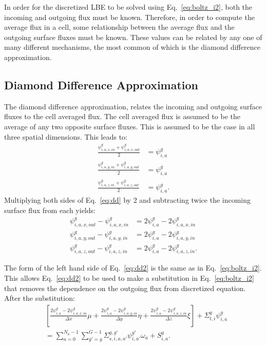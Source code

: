 In order for the discretized LBE to be solved using Eq.~\ref{eq:boltz_i2}, both the incoming and outgoing flux must be known. Therefore, in order to compute the average flux in a cell, some relationship between the average flux and the outgoing surface fluxes must be known. These values can be related by any one of many different mechanisms, the most common of which is the diamond difference approximation.

\subsection{Diamond Difference Approximation}

The diamond difference approximation, relates the incoming and outgoing surface fluxes to the cell averaged flux. The cell averaged flux is assumed to be the average of any two opposite surface fluxes. This is assumed to be the case in all three spatial dimensions. This leads to:
\begin{equation} \label{eq:dd}
\begin{split}
\frac{\psi_{i,a,x,in}^g + \psi_{i,a,x,out}^g}{2} &= \psi_{i,a}^{g} \\
\frac{\psi_{i,a,y,in}^g + \psi_{i,a,y,out}^g}{2} &= \psi_{i,a}^{g} \\
\frac{\psi_{i,a,z,in}^g + \psi_{i,a,z,out}^g}{2} &= \psi_{i,a}^{g}.
\end{split}
\end{equation}
Multiplying both sides of Eq.~\ref{eq:dd} by 2 and subtracting twice the incoming surface flux from each yields:
\begin{equation} \label{eq:dd2}
\begin{split}
\psi_{i,a,x,out}^g - \psi_{i,a,x,in}^g &= 2\psi_{i,a}^{g} - 2\psi_{i,a,x,in}^g \\
\psi_{i,a,y,out}^g - \psi_{i,a,y,in}^g &= 2\psi_{i,a}^{g} - 2\psi_{i,a,y,in}^g \\
\psi_{i,a,z,out}^g - \psi_{i,a,z,in}^g &= 2\psi_{i,a}^{g} - 2\psi_{i,a,z,in}^g.
\end{split}
\end{equation}

The form of the left hand side of Eq.~\ref{eq:dd2} is the same as in Eq.~\ref{eq:boltz_i2}. This allows Eq.~\ref{eq:dd2} to be used to make a substitution in Eq.~\ref{eq:boltz_i2} that removes the dependence on the outgoing flux from discretized equation. After the substitution:
\begin{equation} \label{eq:boltz_i3}
\begin{split}
&\left[ 
\frac{2\psi_{i,a}^{g} - 2\psi_{i,a,x,in}^g}{\Delta x} \mu + 
\frac{2\psi_{i,a}^{g} - 2\psi_{i,a,y,in}^g}{\Delta y} \eta + 
\frac{2\psi_{i,a}^{g} - 2\psi_{i,a,z,in}^g}{\Delta z} \xi
\right]
+ \Sigma_{t,i}^g \psi_{i,a}^{g} \\
& = 
\sum_{a=0}^{N_a-1} \sum_{g'=g}^{G-1} \Sigma_{s, i, a, a'}^{g, g'} \psi_{i, a'}^{g'} \omega_a + S_{i,a}^g.
\end{split}
\end{equation}

